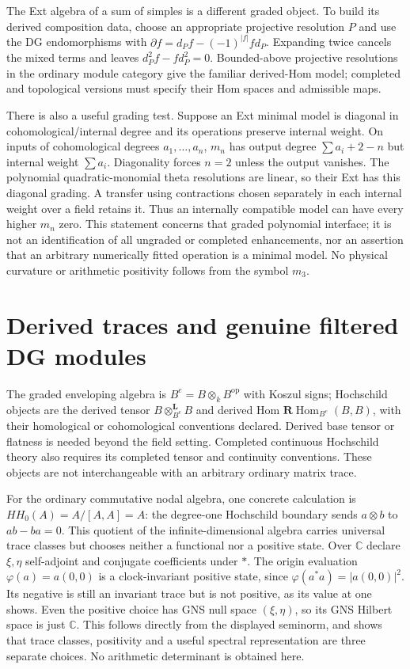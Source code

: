 The Ext algebra of a sum of simples is a different graded object. To build
its derived composition data, choose an appropriate projective resolution
$P$ and use the DG endomorphisms with
$\partial f=d_Pf-(-1)^{|f|}fd_P$. Expanding twice cancels the mixed terms
and leaves $d_P^2f-fd_P^2=0$. Bounded-above projective resolutions in the
ordinary module category give the familiar derived-Hom model; completed
and topological versions must specify their Hom spaces and admissible maps.

There is also a useful grading test. Suppose an Ext minimal model is diagonal
in cohomological/internal degree and its operations preserve internal weight.
On inputs of cohomological degrees $a_1,\ldots,a_n$, $m_n$ has output
degree $\sum a_i+2-n$ but internal weight $\sum a_i$. Diagonality forces
$n=2$ unless the output vanishes. The polynomial quadratic-monomial theta
resolutions are linear, so their Ext has this diagonal grading. A transfer
using contractions chosen separately in each internal weight over a field
retains it. Thus an internally compatible model can have every higher
$m_n$ zero. This statement concerns that graded polynomial interface; it
is not an identification of all ungraded or completed enhancements, nor
an assertion that an arbitrary numerically fitted operation is a minimal
model. No physical curvature or arithmetic positivity follows from the
symbol $m_3$.


\section{Derived traces and genuine filtered DG modules}
The graded enveloping algebra is $B^e=B\otimes_k B^{\mathrm{op}}$ with
Koszul signs; Hochschild objects are the derived tensor
$B\otimes^{\mathbf L}_{B^e}B$ and derived Hom
$\mathbf R\operatorname{Hom}_{B^e}(B,B)$, with their homological or
cohomological conventions declared. Derived base tensor or flatness is
needed beyond the field setting. Completed continuous Hochschild theory
also requires its completed tensor and continuity conventions. These
objects are not interchangeable with an arbitrary ordinary matrix trace.

For the ordinary commutative nodal algebra, one concrete calculation is
$HH_0(A)=A/[A,A]=A$: the degree-one Hochschild boundary sends
$a\otimes b$ to $ab-ba=0$. This quotient of the infinite-dimensional algebra carries universal trace
classes but chooses neither a functional nor a positive state. Over $\mathbb C$ declare
$\xi,\eta$ self-adjoint and conjugate coefficients under $*$. The
origin evaluation $\varphi(a)=a(0,0)$ is a clock-invariant positive state,
since $\varphi(a^*a)=|a(0,0)|^2$. Its negative is still an invariant trace
but is not positive, as its value at one shows. Even the positive choice
has GNS null space $(\xi,\eta)$, so its GNS Hilbert space is just
$\mathbb C$. This follows directly from the displayed seminorm, and
shows that trace classes, positivity and a useful spectral representation
are three separate choices. No arithmetic determinant is obtained here.

